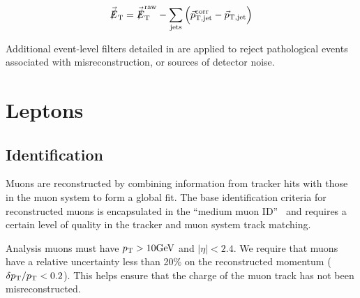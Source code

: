 \begin{equation}
    \vec{\slashed{E}}_\mathrm{T}
    = \vec{\slashed{E}}_\mathrm{T}^\mathrm{raw}
    - \sum_{\mathrm{jets}} \left( 
        \vec{p}_\mathrm{T,jet}^\text{corr} 
        - \vec{p}_\mathrm{T,jet}
    \right)
\end{equation}

Additional event-level filters detailed in \cite{CMS:JetMETFilters} are applied 
to reject pathological events associated with misreconstruction, or sources of 
detector noise.

\section{Leptons}

\subsection{Identification}

Muons are reconstructed by combining information from tracker hits
with those in the muon system to form a global fit.
The base identification criteria for reconstructed muons is encapsulated in the 
``medium muon ID''~\cite{CMS:Sirunyan2019yvv} and requires
a certain level of quality in the tracker and muon system track matching.

Analysis muons must have $p_{\mathrm{T}}>10\text{GeV}$ and $|\eta|<2.4$. 
We require that muons have a relative 
uncertainty less than 20\% on the reconstructed momentum ($\delta p_{\mathrm{T}}/p_{\mathrm{T}}<0.2$).
This helps ensure that the charge of the muon track has not been misreconstructed.

